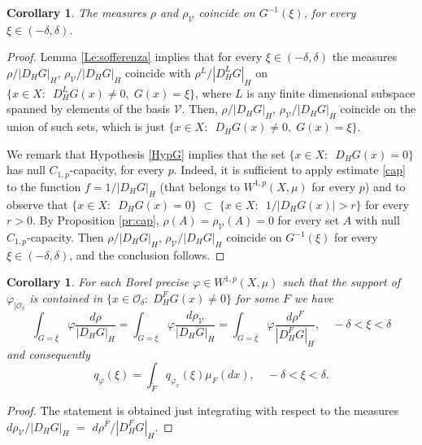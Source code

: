 \documentclass[reqno,twoside,12pt]{amsart}
\newtheorem{Corollary}[Theorem]{Corollary}
\begin{document}
\begin{Corollary}
The measures $\rho$ and $\rho_{\mathcal V}$ coincide on $ G^{-1}(\xi)$, for every $\xi\in (-\delta, \delta)$. 
\end{Corollary}
\begin{proof}
Lemma \ref{Le:sofferenza} implies that for every  $\xi \in (-\delta, \delta)$ the measures 
$\rho/|D_HG|_H$,  $\rho_{\mathcal V}/|D_HG|_H$ coincide with  $\rho^L/|D_H^LG|_H$ on $\{  x\in X:\  \; D_H^L G(x)\neq 0, \; G(x)=\xi \}$, where $L$ is any finite dimensional subspace  spanned by elements of the basis $\mathcal V$. 
Then, $\rho/|D_HG|_H$,  $\rho_{\mathcal V}/|D_HG|_H$ coincide on the union of such sets, which is just $\{ x\in X:\  \; D_H G(x)\neq 0, \;G(x) = \xi \}$. 

We remark that  Hypothesis \ref{HypG} implies that the set $\{ x\in X:\  \; D_H G(x) = 0\}$ has null $C_{1,p}$-capacity, for every $p$. Indeed, it is sufficient to apply estimate \eqref{cap} to the function  $f= 1/|D_HG|_H$ (that belongs to $W^{1,p}(X, \mu)$ for every $p$) and to observe that $\{ x\in X:\  \; D_H G(x) =  0\}$ $\subset$ $\{ x\in X:\  \; 1/|D_H G(x)|>r\}$ for every $r>0$. 
By Proposition \ref{pr:cap},  $\rho(A) =  \rho_{\mathcal V}(A) =0$ for every set $A$ with null $C_{1,p}$-capacity. Then $\rho/|D_HG|_H$,  $\rho_{\mathcal V}/|D_HG|_H$ coincide on $G^{-1}(\xi)$ for every $\xi\in (-\delta, \delta)$, and the  conclusion follows. 
\end{proof}

\begin{Corollary}
\label{Cor:sofferenza}
For each Borel precise  $\varphi\in  W^{1,p}(X, \mu)$ such that the support of $\varphi_{| {\mathcal O}_{\delta}}$ is contained  in $\{x\in {\mathcal O}_{\delta}:\;D_H^FG(x) \neq 0\}$ for some $F$ we have
$$\int_{G=\xi} \varphi  \frac{d\rho  }{|D_H G|_H} = \int_{G=\xi} \varphi  \frac{d\rho _{\mathcal V} }{|D_H G|_H} = \int_{G=\xi} \varphi  \frac{d\rho^F}{|D_H^FG|_H}, \quad -\delta < \xi < \delta $$
and consequently 
\begin{equation}
\label{sofferenza}
q_{\varphi}(\xi) =   \int_{\widetilde{F}} q_{\varphi_x}(\xi)  \mu_F(dx), \quad -\delta <\xi <\delta . 
\end{equation}
\end{Corollary}
\begin{proof} 
The  statement is obtained just integrating with respect to the measures  $d\rho_{\mathcal V}/|D_H G|_H $ $=$ $ d\rho^F/|D_H^FG|_H$. \end{proof}
 
\end{document}
